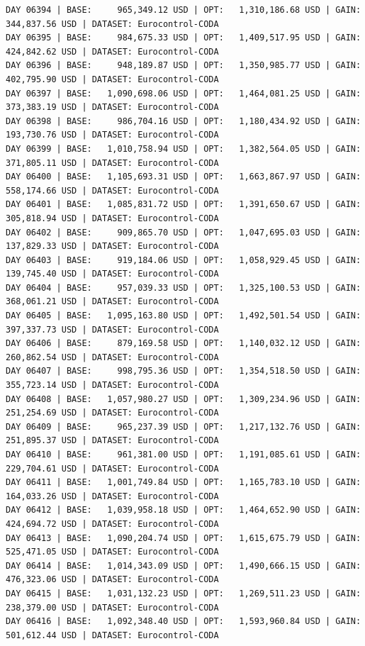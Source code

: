 \documentclass[11pt,a4paper]{article}
\begin{document}
\begin{verbatim}
DAY 06394 | BASE:     965,349.12 USD | OPT:   1,310,186.68 USD | GAIN: 344,837.56 USD | DATASET: Eurocontrol-CODA
DAY 06395 | BASE:     984,675.33 USD | OPT:   1,409,517.95 USD | GAIN: 424,842.62 USD | DATASET: Eurocontrol-CODA
DAY 06396 | BASE:     948,189.87 USD | OPT:   1,350,985.77 USD | GAIN: 402,795.90 USD | DATASET: Eurocontrol-CODA
DAY 06397 | BASE:   1,090,698.06 USD | OPT:   1,464,081.25 USD | GAIN: 373,383.19 USD | DATASET: Eurocontrol-CODA
DAY 06398 | BASE:     986,704.16 USD | OPT:   1,180,434.92 USD | GAIN: 193,730.76 USD | DATASET: Eurocontrol-CODA
DAY 06399 | BASE:   1,010,758.94 USD | OPT:   1,382,564.05 USD | GAIN: 371,805.11 USD | DATASET: Eurocontrol-CODA
DAY 06400 | BASE:   1,105,693.31 USD | OPT:   1,663,867.97 USD | GAIN: 558,174.66 USD | DATASET: Eurocontrol-CODA
DAY 06401 | BASE:   1,085,831.72 USD | OPT:   1,391,650.67 USD | GAIN: 305,818.94 USD | DATASET: Eurocontrol-CODA
DAY 06402 | BASE:     909,865.70 USD | OPT:   1,047,695.03 USD | GAIN: 137,829.33 USD | DATASET: Eurocontrol-CODA
DAY 06403 | BASE:     919,184.06 USD | OPT:   1,058,929.45 USD | GAIN: 139,745.40 USD | DATASET: Eurocontrol-CODA
DAY 06404 | BASE:     957,039.33 USD | OPT:   1,325,100.53 USD | GAIN: 368,061.21 USD | DATASET: Eurocontrol-CODA
DAY 06405 | BASE:   1,095,163.80 USD | OPT:   1,492,501.54 USD | GAIN: 397,337.73 USD | DATASET: Eurocontrol-CODA
DAY 06406 | BASE:     879,169.58 USD | OPT:   1,140,032.12 USD | GAIN: 260,862.54 USD | DATASET: Eurocontrol-CODA
DAY 06407 | BASE:     998,795.36 USD | OPT:   1,354,518.50 USD | GAIN: 355,723.14 USD | DATASET: Eurocontrol-CODA
DAY 06408 | BASE:   1,057,980.27 USD | OPT:   1,309,234.96 USD | GAIN: 251,254.69 USD | DATASET: Eurocontrol-CODA
DAY 06409 | BASE:     965,237.39 USD | OPT:   1,217,132.76 USD | GAIN: 251,895.37 USD | DATASET: Eurocontrol-CODA
DAY 06410 | BASE:     961,381.00 USD | OPT:   1,191,085.61 USD | GAIN: 229,704.61 USD | DATASET: Eurocontrol-CODA
DAY 06411 | BASE:   1,001,749.84 USD | OPT:   1,165,783.10 USD | GAIN: 164,033.26 USD | DATASET: Eurocontrol-CODA
DAY 06412 | BASE:   1,039,958.18 USD | OPT:   1,464,652.90 USD | GAIN: 424,694.72 USD | DATASET: Eurocontrol-CODA
DAY 06413 | BASE:   1,090,204.74 USD | OPT:   1,615,675.79 USD | GAIN: 525,471.05 USD | DATASET: Eurocontrol-CODA
DAY 06414 | BASE:   1,014,343.09 USD | OPT:   1,490,666.15 USD | GAIN: 476,323.06 USD | DATASET: Eurocontrol-CODA
DAY 06415 | BASE:   1,031,132.23 USD | OPT:   1,269,511.23 USD | GAIN: 238,379.00 USD | DATASET: Eurocontrol-CODA
DAY 06416 | BASE:   1,092,348.40 USD | OPT:   1,593,960.84 USD | GAIN: 501,612.44 USD | DATASET: Eurocontrol-CODA

\end{verbatim}
\end{document}
